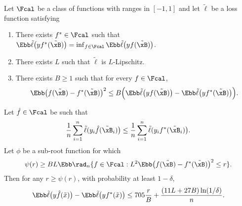 \documentclass[11pt]{article}
\begin{document}
\begin{lemma}\label{thm:risk-local-rad}
Let $\Fcal$ be a class of functions with ranges in $[-1, 1]$ and let $\tilde\ell$ be a loss function satisfying
\begin{enumerate}[leftmargin=*]
    \item There exists $f^*\in\Fcal$ such that $\Ebb \tilde\ell\big(y f^*(\tilde\xB) \big) = \inf_{f\in\Fcal}\Ebb \tilde\ell\big(y f(\tilde\xB) \big)$.
    \item There exists $L$ such that $\tilde\ell$ is $L$-Lipschitz.
    \item There exists $B\ge 1$ such that for every $f\in\Fcal$,
    \[
    \Ebb \big(f(\tilde\xB) - f^*(\tilde\xB) \big)^2 
\le B \Big(\Ebb \tilde\ell\big(y f(\tilde\xB)\big) -\Ebb \tilde\ell\big(y f^*(\tilde\xB)\big) \Big).
\]
\end{enumerate}
Let $\hat f \in \Fcal$ be such that 
\[
\frac{1}{n}\sum_{i=1}^n \tilde\ell(y_i \hat f(\tilde\xB_i)\big) \le \frac{1}{n}\sum_{i=1}^n \tilde\ell(y_i f^*(\tilde\xB_i)\big).
\]
Let $\phi$ be a sub-root function for which 
\begin{align*}
    \psi(r) \ge BL \Ebb \rad_n\{ f\in\Fcal: L^2 \Ebb \big(f(\tilde\xB) - f^*(\tilde\xB) \big)^2 \le r  \}.
\end{align*}
Then for any $r\ge \psi(r)$, with probability at least $1-\delta$, 
\begin{align*}
    \Ebb \tilde\ell\big(y \hat f (\tilde x)\big) -  \Ebb \tilde\ell\big(y  f^* (\tilde x)\big) \le 705 \frac{r}{B} + \frac{(11L + 27B)\ln(1/\delta)}{n}.
\end{align*}
\end{lemma}
\end{document}
